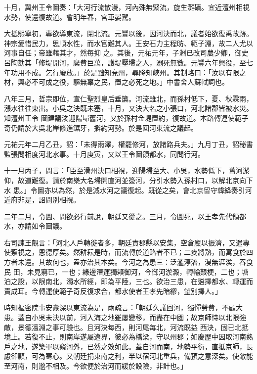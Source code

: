 \begin{pinyinscope}
 十月，冀州王令圖奏：「大河行流散漫，河內殊無緊流，旋生灘磧。宜近澶州相視水勢，使還復故道。會明年春，宮車晏駕。



 大抵熙寧初，專欲導東流，閉北流。元豐以後，因河決而北，議者始欲復禹故跡。神宗愛惜民力，思順水性，而水官難其人。王安石力主程昉、範子淵，故二人尤以河事自任；帝雖藉其才，然每抑
 之。其後，元祐元年，子淵已改司農少卿，御史呂陶劾其「修堤開河，縻費巨萬，護堤壓埽之人，溺死無數。元豐六年興役，至七年功用不成。乞行廢放。」於是黜知兗州，尋降知峽州。其制略曰：「汝以有限之材，興必不可成之役，驅無辜之民，置之必死之地。」中書舍人蘇軾詞也。



 八年三月，哲宗即位，宣仁聖烈皇后垂簾。河流雖北，而孫村低下，夏、秋霖雨，漲水往往東出。小吳之決既未塞，十月，又決大名之小張口，河北諸郡皆被水災。知澶州王令
 圖建議浚迎陽埽舊河，又於孫村金堤置約，復故道。本路轉運使範子奇仍請於大吳北岸修進鋸牙，擗約河勢。於是回河東流之議起。



 元祐元年二月乙丑，詔：「未得雨澤，權罷修河，放諸路兵夫。」九月丁丑，詔秘書監張問相度河北水事。十月庚寅，又以王令圖領都水，同問行河。



 十一月丙子，問言：「臣至滑州決口相視，迎陽埽至大、小吳，水勢低下，舊河淤仰，故道難復。請於南樂大名埽開直河並簽河，分引水勢入孫村口，以解北京向下水
 患。」令圖亦以為然，於是減水河之議復起。既從之矣，會北京留守韓絳奏引河近府非是，詔問別相視。



 二年二月，令圖、問欲必行前說，朝廷又從之。三月，令圖死，以王孝先代領都水，亦請如令圖議。



 右司諫王覿言：「河北人戶轉徙者多，朝廷責郡縣以安集，空倉廩以振濟，又遣專使察視之，恩德厚矣。然耕耘是時，而流轉於道路者不已；二麥將熟，而寓食於四方者未還。其故何也，盍亦治其本矣。今河之為患三：泛濫渟滀，漫無涯涘，吞食民
 田，未見窮已，一也；緣邊漕運獨賴御河，今御河淤澱，轉輸艱梗，二也；塘泊之設，以限南北，濁水所經，即為平陸，三也。欲治三患，在遴擇都水、轉運而責成耳。今轉運使範子奇反復求合，都水使者王孝先暗繆，望別擇人。」



 時知樞密院事安燾深以東流為是，兩疏言：「朝廷久議回河，獨憚勞費，不顧大患。蓋自小吳未決以前，河入海之地雖屢變移，而盡在中國；故京師恃以北限強敵，景德澶淵之事可驗也。且河決每西，則河尾每北，河流既益
 西決，固已北抵境上。若復不止，則南岸遂屬遼界，彼必為橋梁，守以州郡；如慶歷中因取河南熟戶之地，遂築軍以窺河外，已然之效如此。蓋自河而南，地勢平衍，直抵京師，長慮卻顧，可為寒心。又朝廷捐東南之利，半以宿河北重兵，備預之意深矣。使敵能至河南，則邈不相及。今欲便於治河而緩於設險，非計也。」




\end{pinyinscope}
